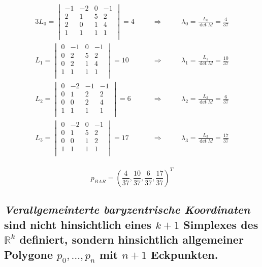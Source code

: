 \documentclass[a4paper,10pt,DIV=14]{article}
\begin{document}
\begin{alignat*}{3}
	L_0 = \begin{vmatrix}
				-1 & -2 &  0 & -1 \\
			 2 &  1 &  5 &  2 \\
			 2 &  0 &  1 &  4 \\
			 1 &  1 &  1 &  1 \\
			\end{vmatrix} = 4
	& \qquad \Rightarrow \qquad
	& \lambda_0 = \frac{L_0}{\det M} = \frac{4}{37} \\
	L_1 = \begin{vmatrix}
				0 & -1 &  0 & -1 \\
				0 &  2 &  5 &  2 \\
				0 &  2 &  1 &  4 \\
				1 &  1 &  1 &  1 \\
	 	  \end{vmatrix} = 10
	& \qquad \Rightarrow \qquad
	& \lambda_1 = \frac{L_1}{\det M} = \frac{10}{37} \\
	L_2 = \begin{vmatrix}
				0 & -2 & -1 & -1 \\
				0 &  1 &  2 &  2 \\
				0 &  0 &  2 &  4 \\
				1 &  1 &  1 &  1 \\
			\end{vmatrix} = 6
	& \qquad \Rightarrow \qquad
	& \lambda_2 = \frac{L_2}{\det M} = \frac{6}{37} \\
	L_3 = \begin{vmatrix}
				0 & -2 &  0 & -1 \\
				0 &  1 &  5 &  2 \\
				0 &  0 &  1 &  2 \\
				1 &  1 &  1 &  1 \\
			\end{vmatrix} = 17
	& \qquad \Rightarrow \qquad
	& \lambda_3 = \frac{L_3}{\det M} = \frac{17}{37} \\
\end{alignat*}

$$ p_{BAR} = \left( \frac{4}{37}, \frac{10}{37}, \frac{6}{37}, \frac{17}{37} \right)  ^T $$

\subsection{\emph{Verallgemeinterte baryzentrische Koordinaten} sind nicht hinsichtlich eines $k+1$ Simplexes des $\mathbb{R}^k$ definiert, sondern hinsichtlich allgemeiner Polygone $p_0, \dots, p_n$ mit $n+1$ Eckpunkten.}
\end{document}
